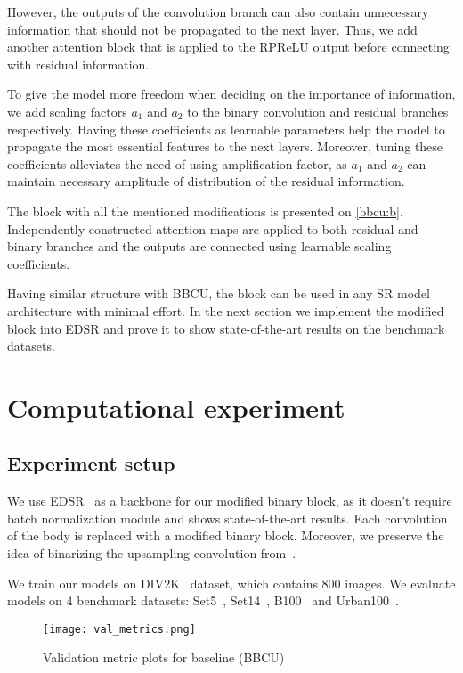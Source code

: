 \documentclass{article}
\begin{document}
However, the outputs of the convolution branch can also contain unnecessary information that should not be propagated to the next layer. Thus, we add another attention block that is applied to the RPReLU output before connecting with residual information.

To give the model more freedom when deciding on the importance of information, we add scaling factors $a_1$ and $a_2$ to the binary convolution and residual branches respectively. Having these coefficients as learnable parameters help the model to propagate the most essential features to the next layers. Moreover, tuning these coefficients alleviates the need of using amplification factor, as $a_1$ and $a_2$ can maintain necessary amplitude of distribution of the residual information.

The block with all the mentioned modifications is presented on \ref{bbcu:b}. Independently constructed attention maps are applied to both residual and binary branches and the outputs are connected using learnable scaling coefficients. 

Having similar structure with BBCU, the block can be used in any SR model architecture with minimal effort. In the next section we implement the modified block into EDSR and prove it to show state-of-the-art results on the benchmark datasets.

\section{Computational experiment}
\subsection{Experiment setup}

We use EDSR~\cite{lim2017enhanced} as a backbone for our modified binary block, as it doesn't require batch normalization module and shows state-of-the-art results. Each convolution of the body is replaced with a modified binary block. Moreover, we preserve the idea of binarizing the upsampling convolution from~\cite{xia2022basic}. 

We train our models on DIV2K~\cite{agustsson2017ntire} dataset, which contains 800 images. We evaluate models on 4 benchmark datasets: Set5~\cite{bevilacqua2012low}, Set14~\cite{zeyde2012single}, B100~\cite{martin2001database} and Urban100~\cite{huang2015single}. 

\begin{figure}[t]
\caption{Validation metric plots for baseline (BBCU)}
\centering
\texttt{[image: val\_metrics.png]}
\label{baseline}
\end{figure}
\end{document}
